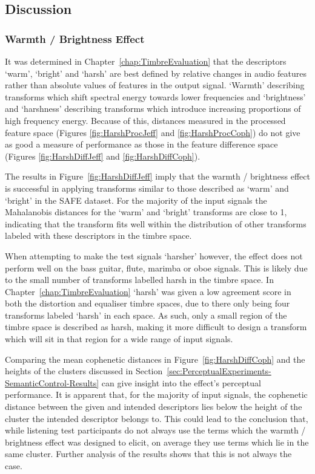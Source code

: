 	\subsection{Discussion}
	\label{sec:PerceptualExperiments-SemanticControl-Discussion}
		\subsubsection*{Warmth / Brightness Effect}
			It was determined in Chapter~\ref{chap:TimbreEvaluation} that the descriptors `warm', `bright' and
			`harsh' are best defined by relative changes in audio features rather than absolute values of
			features in the output signal. `Warmth' describing transforms which shift spectral energy towards
			lower frequencies and `brightness' and `harshness' describing transforms which introduce increasing
			proportions of high frequency energy. Because of this, distances measured in the processed feature
			space (Figures \ref{fig:HarshProcJeff} and \ref{fig:HarshProcCoph}) do not give as good a measure
			of performance as those in the feature difference space (Figures \ref{fig:HarshDiffJeff} and
			\ref{fig:HarshDiffCoph}).

			The results in Figure~\ref{fig:HarshDiffJeff} imply that the warmth / brightness effect is
			successful in applying transforms similar to those described as `warm' and `bright' in the SAFE
			dataset. For the majority of the input signals the Mahalanobis distances for the `warm' and
			`bright' transforms are close to 1, indicating that the transform fits well within the distribution
			of other transforms labeled with these descriptors in the timbre space.
			
			When attempting to make the test signals `harsher' however, the effect does not perform well on the
			bass guitar, flute, marimba or oboe signals. This is likely due to the small number of transforms
			labelled harsh in the timbre space. In Chapter~\ref{chap:TimbreEvaluation} `harsh' was given a low
			agreement score in both the distortion and equaliser timbre spaces, due to there only being four
			transforms labeled `harsh' in each space. As such, only a small region of the timbre space is
			described as harsh, making it more difficult to design a transform which will sit in that region
			for a wide range of input signals.
			
			Comparing the mean cophenetic distances in Figure~\ref{fig:HarshDiffCoph} and the heights of the
			clusters discussed in Section~\ref{sec:PerceptualExperiments-SemanticControl-Results} can give
			insight into the effect's perceptual performance. It is apparent that, for the majority of input
			signals, the cophenetic distance between the given and intended descriptors lies below the height
			of the cluster the intended descriptor belongs to. This could lead to the conclusion that, while
			listening test participants do not always use the terms which the warmth / brightness effect was
			designed to elicit, on average they use terms which lie in the same cluster. Further analysis of
			the results shows that this is not always the case. 

